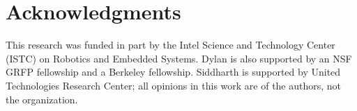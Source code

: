 \section*{Acknowledgments}
This research was funded in part by the Intel Science and Technology
Center (ISTC) on Robotics and Embedded Systems. Dylan is also
supported by an NSF GRFP fellowship and a Berkeley fellowship.
Siddharth is supported by United Technologies Research Center; all opinions
in this work are of the authors, not the organization.
